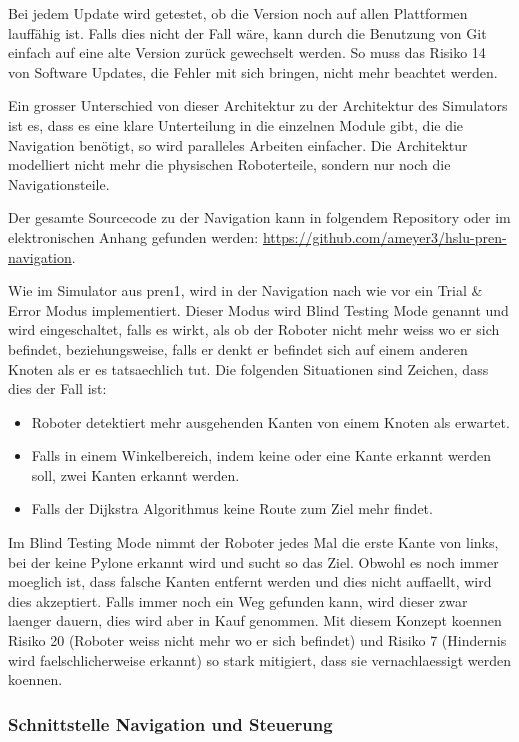 Bei jedem Update wird getestet, ob die Version noch auf allen Plattformen lauffähig ist. Falls dies nicht der Fall wäre, kann durch die Benutzung von Git einfach auf eine alte Version zurück gewechselt werden. So muss das Risiko 14 von Software Updates, die Fehler mit sich bringen, nicht mehr beachtet werden.


Ein grosser Unterschied von dieser Architektur zu der Architektur des Simulators ist es, dass es eine klare Unterteilung in die einzelnen Module gibt, die die Navigation benötigt, so wird paralleles Arbeiten einfacher. Die Architektur modelliert nicht mehr die physischen Roboterteile, sondern nur noch die Navigationsteile.

Der gesamte Sourcecode zu der Navigation kann in folgendem Repository oder im elektronischen Anhang gefunden werden: \url{https://github.com/ameyer3/hslu-pren-navigation}.

Wie im Simulator aus \acrshort{pren1}, wird in der Navigation nach wie vor ein Trial \& Error Modus implementiert. Dieser Modus wird Blind Testing Mode genannt und wird eingeschaltet, falls es wirkt, als ob der Roboter nicht mehr weiss wo er sich befindet, beziehungsweise, falls er denkt er befindet sich auf einem anderen Knoten als er es tatsaechlich tut. Die folgenden Situationen sind Zeichen, dass dies der Fall ist:

\begin{itemize}
    \item Roboter detektiert mehr ausgehenden Kanten von einem Knoten als erwartet.
    \item Falls in einem Winkelbereich, indem keine oder eine Kante erkannt werden soll, zwei Kanten erkannt werden.
    \item Falls der Dijkstra Algorithmus keine Route zum Ziel mehr findet.
\end{itemize}

Im Blind Testing Mode nimmt der Roboter jedes Mal die erste Kante von links, bei der keine Pylone erkannt wird und sucht so das Ziel. Obwohl es noch immer moeglich ist, dass falsche Kanten entfernt werden und dies nicht auffaellt, wird dies akzeptiert. Falls immer noch ein Weg gefunden kann, wird dieser zwar laenger dauern, dies wird aber in Kauf genommen. Mit diesem Konzept koennen Risiko 20 (Roboter weiss nicht mehr wo er sich befindet) und Risiko 7 (Hindernis wird faelschlicherweise erkannt) so stark mitigiert, dass sie vernachlaessigt werden koennen.

\subsubsection{Schnittstelle Navigation und Steuerung}

